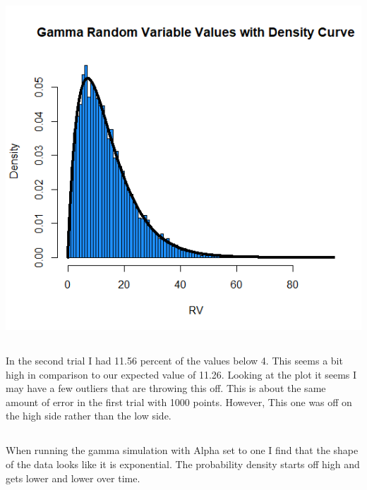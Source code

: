 \documentclass[letterpaper, onecolumn,10pt]{IEEEtran}
\begin{document}
                \includegraphics{week2/GammaSimTwo.png}
            \subsection{}
		        In the second trial I had 11.56 percent of the values below 4. This seems a bit high in comparison to our expected value of 11.26. Looking at the plot it seems I may have a few outliers that are throwing this off. This is about the same amount of error in the first trial with 1000 points. However, This one was off on the high side rather than the low side.\\
		        
		    \subsection{}
		        When running the gamma simulation with Alpha set to one I find that the shape of the data looks like it is exponential. The probability density starts off high and gets lower and lower over time.\\
		    
\end{document}
